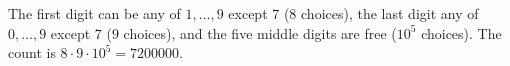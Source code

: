 The first digit can be any of $1,\dots,9$ except $7$ ($8$ choices), the last digit any of $0,\dots,9$ except $7$ ($9$ choices), and the five middle digits are free ($10^5$ choices). The count is $8\cdot9\cdot10^5=\boxed{7200000}$.
